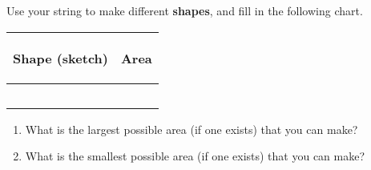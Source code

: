 \documentclass[noauthor,nooutcomes]{ximera}
\begin{document}
\begin{problem} Use your string to make different {\bf shapes}, and fill in the following chart.
\vskip 0.1in
\begin{tabular}{|p{2.2in}|p{2.2in}|}
\hline
\begin{center} Shape (sketch) \end{center} & \begin{center} Area \end{center}  \\ \hline
 & \\ [10ex] \hline
 & \\ [10 ex] \hline
 & \\ [10 ex] \hline
 & \\ [10 ex] \hline
 & \\ [10 ex] \hline
\end{tabular}


\begin{enumerate}

\item What is the largest possible area (if one exists) that you can make?
\item What is the smallest possible area (if one exists) that you can make?
\end{enumerate}


\end{problem}
\end{document}
